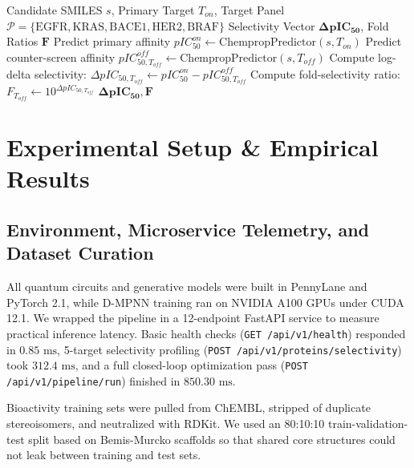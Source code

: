 \documentclass[journal,10pt,twocolumn]{IEEEtran}
\begin{document}
\begin{algorithm}[H]
\caption{Pan-Target Binding \& Log-Delta Selectivity Scoring}
\label{alg:selectivity}
\begin{algorithmic}[1]
\REQUIRE Candidate SMILES $s$, Primary Target $T_{on}$, Target Panel $\mathcal{P} = \{\text{EGFR}, \text{KRAS}, \text{BACE1}, \text{HER2}, \text{BRAF}\}$
\ENSURE Selectivity Vector $\mathbf{\Delta pIC_{50}}$, Fold Ratios $\mathbf{F}$
\STATE Predict primary affinity $pIC_{50}^{on} \leftarrow \text{ChempropPredictor}(s, T_{on})$
    \STATE Predict counter-screen affinity $pIC_{50, T_{off}}^{off} \leftarrow \text{ChempropPredictor}(s, T_{off})$
    \STATE Compute log-delta selectivity: $\Delta pIC_{50, T_{off}} \leftarrow pIC_{50}^{on} - pIC_{50, T_{off}}^{off}$
    \STATE Compute fold-selectivity ratio: $F_{T_{off}} \leftarrow 10^{\Delta pIC_{50, T_{off}}}$
\ENDFOR
\RETURN $\mathbf{\Delta pIC_{50}}, \mathbf{F}$
\end{algorithmic}
\end{algorithm}

\section{Experimental Setup \& Empirical Results}

\subsection{Environment, Microservice Telemetry, and Dataset Curation}
All quantum circuits and generative models were built in PennyLane and PyTorch 2.1, while D-MPNN training ran on NVIDIA A100 GPUs under CUDA 12.1. We wrapped the pipeline in a 12-endpoint FastAPI service to measure practical inference latency. Basic health checks (\texttt{GET /api/v1/health}) responded in $0.85\text{ ms}$, 5-target selectivity profiling (\texttt{POST /api/v1/proteins/selectivity}) took $312.4\text{ ms}$, and a full closed-loop optimization pass (\texttt{POST /api/v1/pipeline/run}) finished in $850.30\text{ ms}$.

Bioactivity training sets were pulled from ChEMBL, stripped of duplicate stereoisomers, and neutralized with RDKit. We used an 80:10:10 train-validation-test split based on Bemis-Murcko scaffolds so that shared core structures could not leak between training and test sets.
\end{document}
